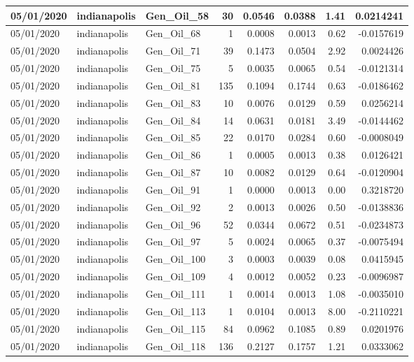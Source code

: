\documentclass[
  letterpaper,
  DIV=11,
  numbers=noendperiod]{scrartcl}
\begin{document}
\begin{tabular}{l|l|l|r|r|r|r|r}
\hline
05/01/2020 & indianapolis & Gen\_Oil\_58 & 30 & 0.0546 & 0.0388 & 1.41 & 0.0214241\\
\hline
05/01/2020 & indianapolis & Gen\_Oil\_68 & 1 & 0.0008 & 0.0013 & 0.62 & -0.0157619\\
\hline
05/01/2020 & indianapolis & Gen\_Oil\_71 & 39 & 0.1473 & 0.0504 & 2.92 & 0.0024426\\
\hline
05/01/2020 & indianapolis & Gen\_Oil\_75 & 5 & 0.0035 & 0.0065 & 0.54 & -0.0121314\\
\hline
05/01/2020 & indianapolis & Gen\_Oil\_81 & 135 & 0.1094 & 0.1744 & 0.63 & -0.0186462\\
\hline
05/01/2020 & indianapolis & Gen\_Oil\_83 & 10 & 0.0076 & 0.0129 & 0.59 & 0.0256214\\
\hline
05/01/2020 & indianapolis & Gen\_Oil\_84 & 14 & 0.0631 & 0.0181 & 3.49 & -0.0144462\\
\hline
05/01/2020 & indianapolis & Gen\_Oil\_85 & 22 & 0.0170 & 0.0284 & 0.60 & -0.0008049\\
\hline
05/01/2020 & indianapolis & Gen\_Oil\_86 & 1 & 0.0005 & 0.0013 & 0.38 & 0.0126421\\
\hline
05/01/2020 & indianapolis & Gen\_Oil\_87 & 10 & 0.0082 & 0.0129 & 0.64 & -0.0120904\\
\hline
05/01/2020 & indianapolis & Gen\_Oil\_91 & 1 & 0.0000 & 0.0013 & 0.00 & 0.3218720\\
\hline
05/01/2020 & indianapolis & Gen\_Oil\_92 & 2 & 0.0013 & 0.0026 & 0.50 & -0.0138836\\
\hline
05/01/2020 & indianapolis & Gen\_Oil\_96 & 52 & 0.0344 & 0.0672 & 0.51 & -0.0234873\\
\hline
05/01/2020 & indianapolis & Gen\_Oil\_97 & 5 & 0.0024 & 0.0065 & 0.37 & -0.0075494\\
\hline
05/01/2020 & indianapolis & Gen\_Oil\_100 & 3 & 0.0003 & 0.0039 & 0.08 & 0.0415945\\
\hline
05/01/2020 & indianapolis & Gen\_Oil\_109 & 4 & 0.0012 & 0.0052 & 0.23 & -0.0096987\\
\hline
05/01/2020 & indianapolis & Gen\_Oil\_111 & 1 & 0.0014 & 0.0013 & 1.08 & -0.0035010\\
\hline
05/01/2020 & indianapolis & Gen\_Oil\_113 & 1 & 0.0104 & 0.0013 & 8.00 & -0.2110221\\
\hline
05/01/2020 & indianapolis & Gen\_Oil\_115 & 84 & 0.0962 & 0.1085 & 0.89 & 0.0201976\\
\hline
05/01/2020 & indianapolis & Gen\_Oil\_118 & 136 & 0.2127 & 0.1757 & 1.21 & 0.0333062\\

\end{tabular}
\end{document}
